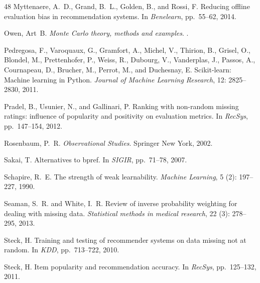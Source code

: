 \documentclass{article}
\begin{document}
\begin{thebibliography}{48}
Myttenaere, A.~D., Grand, B.~L., Golden, B., and Rossi, F.
\newblock Reducing offline evaluation bias in recommendation systems.
\newblock In \emph{Benelearn}, pp.\  55--62, 2014.

Owen, Art~B.
\newblock \emph{Monte Carlo theory, methods and examples}.
.

Pedregosa, F., Varoquaux, G., Gramfort, A., Michel, V., Thirion, B., Grisel,
  O., Blondel, M., Prettenhofer, P., Weiss, R., Dubourg, V., Vanderplas, J.,
  Passos, A., Cournapeau, D., Brucher, M., Perrot, M., and Duchesnay, E.
\newblock Scikit-learn: Machine learning in {P}ython.
\newblock \emph{Journal of Machine Learning Research}, 12: 2825--2830,
  2011.

Pradel, B., Usunier, N., and Gallinari, P.
\newblock Ranking with non-random missing ratings: influence of popularity and
  positivity on evaluation metrics.
\newblock In \emph{RecSys}, pp.\  147--154, 2012.

Rosenbaum, P.~R.
\newblock \emph{Observational Studies}.
\newblock Springer New York, 2002.

Sakai, T.
\newblock Alternatives to bpref.
\newblock In \emph{SIGIR}, pp.\  71--78, 2007.

Schapire, R.~E.
\newblock The strength of weak learnability.
\newblock \emph{Machine Learning}, 5 (2): 197--227, 1990.

Seaman, S.~R. and White, I.~R.
\newblock Review of inverse probability weighting for dealing with missing
  data.
\newblock \emph{Statistical methods in medical research}, 22
  (3): 278--295, 2013.

Steck, H.
\newblock Training and testing of recommender systems on data missing not at
  random.
\newblock In \emph{KDD}, pp.\  713--722, 2010.

Steck, H.
\newblock Item popularity and recommendation accuracy.
\newblock In \emph{RecSys}, pp.\  125--132, 2011.


\end{thebibliography}
\end{document}
